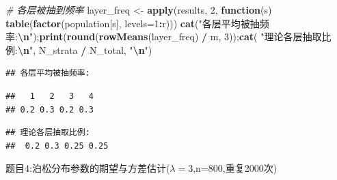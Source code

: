 \documentclass[
]{article}
\newenvironment{Shaded}{\begin{snugshade}}{\end{snugshade}}
\newcommand{\AttributeTok}[1]{\textcolor[rgb]{0.13,0.29,0.53}{#1}}
\newcommand{\CommentTok}[1]{\textcolor[rgb]{0.56,0.35,0.01}{\textit{#1}}}
\newcommand{\ControlFlowTok}[1]{\textcolor[rgb]{0.13,0.29,0.53}{\textbf{#1}}}
\newcommand{\DecValTok}[1]{\textcolor[rgb]{0.00,0.00,0.81}{#1}}
\newcommand{\FunctionTok}[1]{\textcolor[rgb]{0.13,0.29,0.53}{\textbf{#1}}}
\newcommand{\NormalTok}[1]{#1}
\newcommand{\OtherTok}[1]{\textcolor[rgb]{0.56,0.35,0.01}{#1}}
\newcommand{\SpecialCharTok}[1]{\textcolor[rgb]{0.81,0.36,0.00}{\textbf{#1}}}
\newcommand{\StringTok}[1]{\textcolor[rgb]{0.31,0.60,0.02}{#1}}
\begin{document}
\begin{Shaded}
\begin{Highlighting}[]
\CommentTok{\# 各层被抽到频率}
\NormalTok{layer\_freq }\OtherTok{\textless{}{-}} \FunctionTok{apply}\NormalTok{(results, }\DecValTok{2}\NormalTok{, }\ControlFlowTok{function}\NormalTok{(s) }\FunctionTok{table}\NormalTok{(}\FunctionTok{factor}\NormalTok{(population[s], }\AttributeTok{levels=}\DecValTok{1}\SpecialCharTok{:}\NormalTok{r)))}
\FunctionTok{cat}\NormalTok{(}\StringTok{"各层平均被抽频率:}\SpecialCharTok{\textbackslash{}n}\StringTok{"}\NormalTok{);}\FunctionTok{print}\NormalTok{(}\FunctionTok{round}\NormalTok{(}\FunctionTok{rowMeans}\NormalTok{(layer\_freq) }\SpecialCharTok{/}\NormalTok{ m, }\DecValTok{3}\NormalTok{));}\FunctionTok{cat}\NormalTok{(}
\StringTok{"理论各层抽取比例:}\SpecialCharTok{\textbackslash{}n}\StringTok{"}\NormalTok{, N\_strata }\SpecialCharTok{/}\NormalTok{ N\_total, }\StringTok{"}\SpecialCharTok{\textbackslash{}n}\StringTok{"}\NormalTok{)}
\end{Highlighting}
\end{Shaded}

\begin{verbatim}
## 各层平均被抽频率:
\end{verbatim}

\begin{verbatim}
##   1   2   3   4 
## 0.2 0.3 0.2 0.3
\end{verbatim}

\begin{verbatim}
## 理论各层抽取比例:
##  0.2 0.3 0.25 0.25
\end{verbatim}

题目4:泊松分布参数的期望与方差估计(\(\lambda=3\),n=800,重复2000次)
\end{document}

